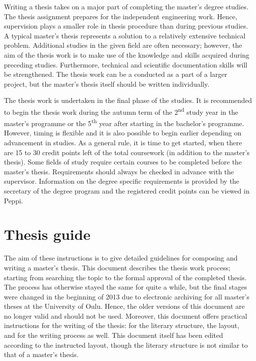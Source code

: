 Writing a thesis takes on a major part of completing the master’s degree studies. The thesis assignment prepares for the independent engineering work. Hence, supervision plays a smaller role in thesis procedure than during previous studies. A typical master’s thesis represents a solution to a relatively extensive technical problem. Additional studies in the given field are often necessary; however, the aim of the thesis work is to make use of the knowledge and skills acquired during preceding studies. Furthermore, technical and scientific documentation skills will be strengthened. The thesis work can be a conducted as a part of a larger project, but the master’s thesis itself should be written individually.

The thesis work is undertaken in the final phase of the studies. It is recommended to begin the thesis work during the autumn term of the 2\textsuperscript{nd} study year in the master’s programme or the 5\textsuperscript{th} year after starting in the bachelor’s programme. However, timing is flexible and it is also possible to begin earlier depending on advancement in studies. As a general rule, it is time to get started, when there are 15 to 30 credit points left of the total coursework (in addition to the master’s thesis). Some fields of study require certain courses to be completed before the master’s thesis. Requirements should always be checked in advance with the supervisor. Information on the degree specific requirements is provided by the secretary of the degree program and the registered credit points can be viewed in Peppi.

\section{Thesis guide}
The aim of these instructions is to give detailed guidelines for composing and writing a master’s thesis. This document describes the thesis work process; starting from searching the topic to the formal approval of the completed thesis. The process has otherwise stayed the same for quite a while, but the final stages were changed in the beginning of 2013 due to electronic archiving for all master’s theses at the University of Oulu. Hence, the older versions of this document are no longer valid and should not be used. Moreover, this document offers practical instructions for the writing of the thesis: for the literary structure, the layout, and for the writing process as well. This document itself has been edited according to the instructed layout, though the literary structure is not similar to that of a master’s thesis.


